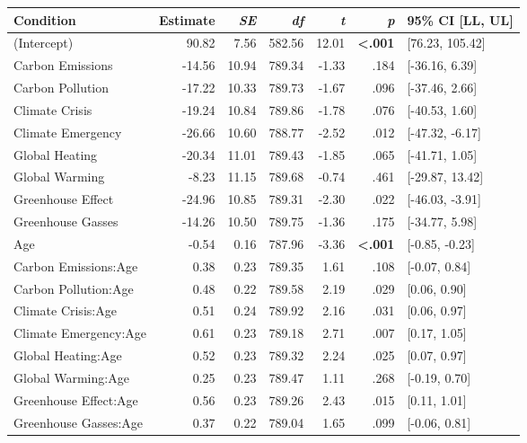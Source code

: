 \begin{table}[ht]
\centering
\begin{tabular}{lrrrrrl}
  \hline
Condition & Estimate & \textit{SE} & \textit{df} & \textit{t} & \textit{p} & 95\% CI [LL, UL] \\ 
  \hline
(Intercept) & 90.82 & 7.56 & 582.56 & 12.01 & \textbf{\textless  .001} & [76.23, 105.42] \\ 
  Carbon Emissions & -14.56 & 10.94 & 789.34 & -1.33 & .184 & [-36.16, 6.39] \\ 
  Carbon Pollution & -17.22 & 10.33 & 789.73 & -1.67 & .096 & [-37.46, 2.66] \\ 
  Climate Crisis & -19.24 & 10.84 & 789.86 & -1.78 & .076 & [-40.53, 1.60] \\ 
  Climate Emergency & -26.66 & 10.60 & 788.77 & -2.52 & .012 & [-47.32, -6.17] \\ 
  Global Heating & -20.34 & 11.01 & 789.43 & -1.85 & .065 & [-41.71, 1.05] \\ 
  Global Warming & -8.23 & 11.15 & 789.68 & -0.74 & .461 & [-29.87, 13.42] \\ 
  Greenhouse Effect & -24.96 & 10.85 & 789.31 & -2.30 & .022 & [-46.03, -3.91] \\ 
  Greenhouse Gasses & -14.26 & 10.50 & 789.75 & -1.36 & .175 & [-34.77, 5.98] \\ 
  Age & -0.54 & 0.16 & 787.96 & -3.36 & \textbf{\textless  .001} & [-0.85, -0.23] \\ 
  Carbon Emissions:Age & 0.38 & 0.23 & 789.35 & 1.61 & .108 & [-0.07, 0.84] \\ 
  Carbon Pollution:Age & 0.48 & 0.22 & 789.58 & 2.19 & .029 & [0.06, 0.90] \\ 
  Climate Crisis:Age & 0.51 & 0.24 & 789.92 & 2.16 & .031 & [0.06, 0.97] \\ 
  Climate Emergency:Age & 0.61 & 0.23 & 789.18 & 2.71 & .007 & [0.17, 1.05] \\ 
  Global Heating:Age & 0.52 & 0.23 & 789.32 & 2.24 & .025 & [0.07, 0.97] \\ 
  Global Warming:Age & 0.25 & 0.23 & 789.47 & 1.11 & .268 & [-0.19, 0.70] \\ 
  Greenhouse Effect:Age & 0.56 & 0.23 & 789.26 & 2.43 & .015 & [0.11, 1.01] \\ 
  Greenhouse Gasses:Age & 0.37 & 0.22 & 789.04 & 1.65 & .099 & [-0.06, 0.81] \\ 
   \hline
\end{tabular}
\end{table}
